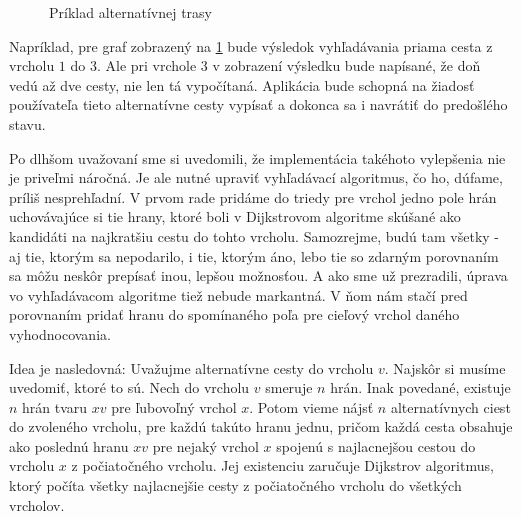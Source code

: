 \begin{figure}[H]
  \caption{Príklad alternatívnej trasy}
  \label{alternativ_priklad}
\end{figure}

Napríklad, pre graf zobrazený na \ref{alternativ_priklad} bude výsledok vyhľadávania priama cesta z vrcholu $1$ do $3$. Ale pri vrchole $3$ v zobrazení výsledku bude napísané, že doň vedú až dve cesty, nie len tá vypočítaná. Aplikácia bude schopná na žiadosť používateľa tieto alternatívne cesty vypísať a dokonca sa i navrátiť do predošlého stavu.\newline

Po dlhšom uvažovaní sme si uvedomili, že implementácia takéhoto vylepšenia nie je priveľmi náročná. Je ale nutné upraviť vyhľadávací algoritmus, čo ho, dúfame, príliš nesprehľadní. V prvom rade pridáme do triedy pre vrchol jedno pole hrán uchovávajúce si tie hrany, ktoré boli v Dijkstrovom algoritme skúšané ako kandidáti na najkratšiu cestu do tohto vrcholu. Samozrejme, budú tam všetky - aj tie, ktorým sa nepodarilo, i tie, ktorým áno, lebo tie so zdarným porovnaním sa môžu neskôr prepísať inou, lepšou možnosťou. A ako sme už prezradili, úprava vo vyhľadávacom algoritme tiež nebude markantná. V ňom nám stačí pred porovnaním pridať hranu do spomínaného poľa pre cieľový vrchol daného vyhodnocovania.\newline

Idea je nasledovná: Uvažujme alternatívne cesty do vrcholu $v$. Najskôr si musíme uvedomiť, ktoré to sú. Nech do vrcholu $v$ smeruje $n$ hrán. Inak povedané, existuje $n$ hrán tvaru $xv$ pre ľubovoľný vrchol $x$. Potom vieme nájsť $n$ alternatívnych ciest do zvoleného vrcholu, pre každú takúto hranu jednu, pričom každá cesta obsahuje ako poslednú hranu $xv$ pre nejaký vrchol $x$ spojenú s najlacnejšou cestou do vrcholu $x$ z počiatočného vrcholu. Jej existenciu zaručuje Dijkstrov algoritmus, ktorý počíta všetky najlacnejšie cesty z počiatočného vrcholu do všetkých vrcholov.\newline


